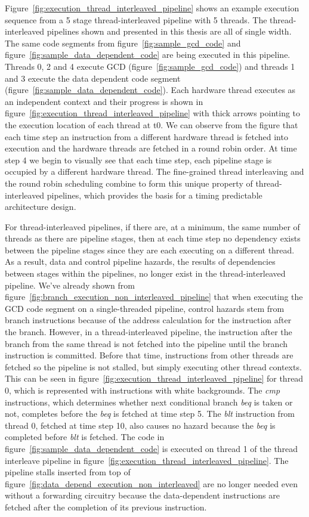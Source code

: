Figure~\ref{fig:execution_thread_interleaved_pipeline} shows an example execution sequence from a 5 stage thread-interleaved pipeline with 5 threads.
The thread-interleaved pipelines shown and presented in this thesis are all of single width.
The same code segments from figure~\ref{fig:sample_gcd_code} and figure~\ref{fig:sample_data_dependent_code} are being executed in this pipeline. 
Threads 0, 2 and 4 execute GCD (figure~\ref{fig:sample_gcd_code}) and threads 1 and 3 execute the data dependent code segment (figure~\ref{fig:sample_data_dependent_code}).
Each hardware thread executes as an independent context and their progress is shown in figure~\ref{fig:execution_thread_interleaved_pipeline} with thick arrows pointing to the execution location of each thread at t0.
We can observe from the figure that each time step an instruction from a different hardware thread is fetched into execution and the hardware threads are fetched in a round robin order.
At time step 4 we begin to visually see that each time step, each pipeline stage is occupied by a different hardware thread.
The fine-grained thread interleaving and the round robin scheduling combine to form this unique property of thread-interleaved pipelines, which provides the basis for a timing predictable architecture design.

For thread-interleaved pipelines, if there are, at a minimum, the same number of threads as there are pipeline stages, then at each time step no dependency exists between the pipeline stages since they are each executing on a different thread. 
As a result, data and control pipeline hazards, the results of dependencies between stages within the pipelines, no longer exist in the thread-interleaved pipeline.    
We've already shown from figure~\ref{fig:branch_execution_non_interleaved_pipeline} that when executing the GCD code segment on a single-threaded pipeline, control hazards stem from branch instructions because of the address calculation for the instruction after the branch.
However, in a thread-interleaved pipeline, the instruction after the branch from the same thread is not fetched into the pipeline until the branch instruction is committed.
Before that time, instructions from other threads are fetched so the pipeline is not stalled, but simply executing other thread contexts.
This can be seen in figure~\ref{fig:execution_thread_interleaved_pipeline} for thread 0, which is represented with instructions with white backgrounds.
The \emph{cmp} instructions, which determines whether next conditional branch \emph{beq} is taken or not, completes before the \emph{beq} is fetched at time step 5.
The \emph{blt} instruction from thread 0, fetched at time step 10, also causes no hazard because the \emph{beq} is completed before \emph{blt} is fetched.
The code in figure~\ref{fig:sample_data_dependent_code} is executed on thread 1 of the thread interleave pipeline in figure~\ref{fig:execution_thread_interleaved_pipeline}.
The pipeline stalls inserted from top of figure~\ref{fig:data_depend_execution_non_interleaved} are no longer needed even without a forwarding circuitry because the data-dependent instructions are fetched after the completion of its previous instruction.

